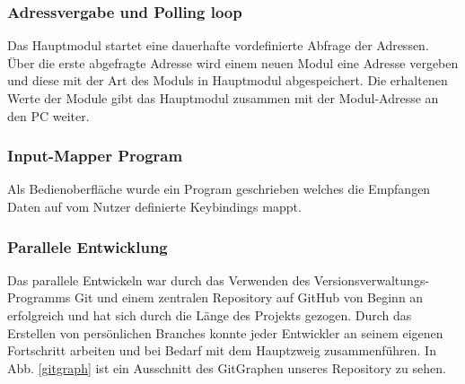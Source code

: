 \subsubsection{Adressvergabe und Polling loop}
Das Hauptmodul startet eine dauerhafte vordefinierte Abfrage der Adressen. Über die erste abgefragte Adresse wird einem neuen Modul eine Adresse vergeben und diese mit der Art des Moduls in Hauptmodul abgespeichert. Die erhaltenen Werte der Module gibt das Hauptmodul zusammen mit der Modul-Adresse an den PC weiter.

\subsubsection{Input-Mapper Program}
Als Bedienoberfläche wurde ein Program geschrieben welches die Empfangen Daten auf vom Nutzer definierte Keybindings mappt.

\subsubsection{Parallele Entwicklung}
Das parallele Entwickeln war durch das Verwenden des Versionsverwaltungs-Programms \glqq Git\grqq{} und einem zentralen Repository auf \glqq GitHub\grqq{} von Beginn an erfolgreich und hat sich durch die Länge des Projekts gezogen. Durch das Erstellen von persönlichen \glqq Branches\grqq{} konnte jeder Entwickler an seinem eigenen Fortschritt arbeiten und bei Bedarf mit dem Hauptzweig zusammenführen. In Abb. \ref{gitgraph} ist ein Ausschnitt des GitGraphen unseres Repository zu sehen.

